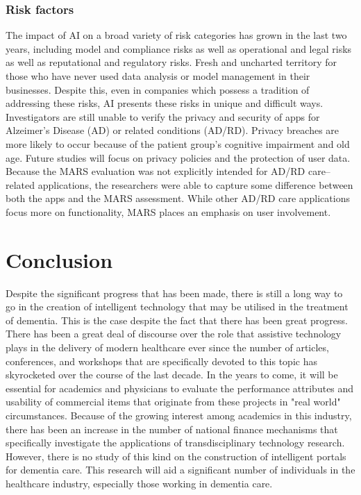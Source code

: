 \subsubsection{Risk factors}
The impact of AI on a broad variety of risk categories has grown in the last two years, including model and compliance risks as well as operational and legal risks as well as reputational and regulatory risks. Fresh and uncharted territory for those who have never used data analysis or model management in their businesses. Despite this, even in companies which possess a tradition of addressing these risks, AI presents these risks in unique and difficult ways. Investigators are still unable to verify the privacy and security of apps for Alzeimer's Disease (AD) or related conditions (AD/RD). Privacy breaches are more likely to occur because of the patient group's cognitive impairment and old age. Future studies will focus on privacy policies and the protection of user data. Because the MARS evaluation was not explicitly intended for AD/RD care–related applications, the researchers were able to capture some difference between both the apps and the MARS assessment. While other AD/RD care applications focus more on functionality, MARS places an emphasis on user involvement.


\goodbreak
\section{Conclusion}
Despite the significant progress that has been made, there is still a long way to go in the creation of intelligent technology that may be utilised in the treatment of dementia. This is the case despite the fact that there has been great progress. There has been a great deal of discourse over the role that assistive technology plays in the delivery of modern healthcare ever since the number of articles, conferences, and workshops that are specifically devoted to this topic has skyrocketed over the course of the last decade. In the years to come, it will be essential for academics and physicians to evaluate the performance attributes and usability of commercial items that originate from these projects in "real world" circumstances. Because of the growing interest among academics in this industry, there has been an increase in the number of national finance mechanisms that specifically investigate the applications of transdisciplinary technology research. However, there is no study of this kind on the construction of intelligent portals for dementia care. This research will aid a significant number of individuals in the healthcare industry, especially those working in dementia care.

